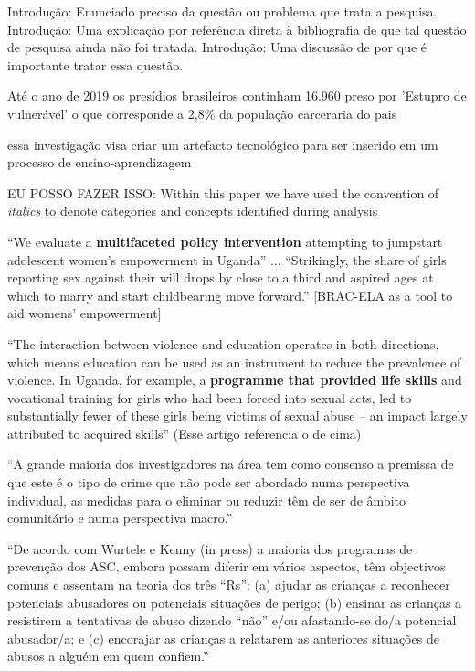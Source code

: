 Introdução: Enunciado preciso da questão ou problema que trata a pesquisa.
Introdução: Uma explicação por referência direta à bibliografia de que tal questão de pesquisa ainda não foi tratada.
Introdução: Uma discussão de por que é importante tratar essa questão. 


Até o ano de 2019 os presídios brasileiros continham 16.960 preso por 'Estupro de vulnerável' o que corresponde a 2,8\% da população carceraria do pais 

essa investigação visa criar um artefacto tecnológico para ser inserido em um processo de ensino-aprendizagem


EU POSSO FAZER ISSO: Within this paper we have used the convention of \textit{italics} to denote categories and concepts identified during analysis

``We evaluate a \textbf{multifaceted policy intervention} attempting to jumpstart adolescent women’s empowerment in Uganda'' ... ``Strikingly, the share of girls reporting sex against their will drops by close to a third and aspired ages at which to marry and start childbearing move forward.'' \cite{bandiera2017women} [BRAC-ELA as a tool to aid womens’ empowerment]

``The interaction between violence and education operates in both directions, which means education can be used as an instrument to reduce the prevalence of violence. In Uganda, for example, a \textbf{programme that provided life skills} and vocational training for girls who had been forced into sexual acts, led to substantially fewer of these girls being victims of sexual abuse – an impact largely attributed to acquired skills''  \cite{owidviolenceagainstrightsforchildren} (Esse artigo referencia o de cima)

``A grande maioria dos investigadores na área tem como consenso a premissa de que este é o tipo de crime que não pode ser abordado numa perspectiva individual, as medidas para o eliminar ou reduzir têm de ser de âmbito comunitário e numa perspectiva macro.''\cite{maria2010papel}

``De acordo com Wurtele e Kenny (in press) a maioria dos programas de prevenção dos ASC, embora possam diferir em vários aspectos, têm objectivos comuns e assentam na teoria dos três “Rs”: (a) ajudar as crianças a reconhecer potenciais abusadores ou potenciais situações de perigo; (b) ensinar as crianças a resistirem a tentativas de abuso dizendo “não” e/ou afastando-se do/a potencial abusador/a; e (c) encorajar as crianças a relatarem as anteriores situações de abusos a alguém em quem confiem.'' \cite{maria2010papel}

